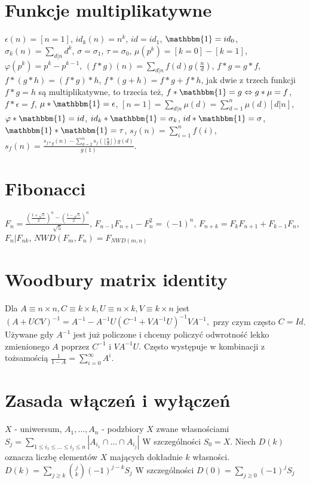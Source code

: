 \section{Funkcje multiplikatywne}
			$\epsilon\left(n\right) = [n = 1]$,
			$id_k\left(n\right) = n^k$, $id = id_1$, $\mathbbm{1} = id_0$,
			$\sigma_k\left(n\right) = \sum_{d|n}d^k$, $\sigma = \sigma_1$, $\tau = \sigma_0$,
			$\mu\left(p^k\right) = [k = 0] - [k = 1]$,
			$\varphi\left(p^k\right) = p^k - p^{k - 1}$,
			$\left(f \ast g\right)\left(n\right) = \sum_{d|n}f\left(d\right)g\left(\frac{n}{d}\right)$,
			$f \ast g = g \ast f$,
			$f \ast \left(g \ast h\right) = \left(f \ast g\right) \ast h$,
			$f \ast \left(g + h\right) = f \ast g + f \ast h$,
			jak dwie z trzech funkcji $f \ast g = h$ są multiplikatywne, to trzecia też,
			$f \ast \mathbbm{1} = g \Leftrightarrow g \ast \mu = f$,
			$f \ast \epsilon = f$,
			$\mu \ast \mathbbm{1} = \epsilon$, $[n = 1] = \sum_{d|n}\mu\left(d\right) =\sum_{d=1}^n\mu\left(d\right)[d|n]$,
			$\varphi \ast \mathbbm{1} = id$,
			$id_k \ast \mathbbm{1} = \sigma_k$, $id \ast \mathbbm{1} = \sigma$, $\mathbbm{1} \ast \mathbbm{1} = \tau$,
			$s_f\left(n\right) = \sum_{i=1}^nf\left(i\right)$,
			$s_f\left(n\right) = \frac{s_{f\ast g}\left(n\right) - \sum_{d=2}^n s_f\left(\lfloor\frac{n}{d}\rfloor\right)g\left(d\right)}{g\left(1\right)}$.

\section{Fibonacci}

$F_n = \frac{\left(\frac{1+\sqrt{5}}{2}\right)^n - \left(\frac{1-\sqrt{5}}{2}\right)^n}{\sqrt{5}}$,
$F_{n-1}F_{n+1}-F_n^2=(-1)^n$, $F_{n+k}=F_k F_{n+1} + F_{k-1} F_n$, $F_n | F_{nk}$, $NWD(F_m, F_n) = F_{NWD(m, n)}$

\section{Woodbury matrix identity}

Dla $A\equiv n\times n, C\equiv k\times k, U\equiv n\times k, V\equiv k\times n$
jest $(A+UCV)^{-1} = A^{-1} - A^{-1}U(C^{-1}+VA^{-1}U)^{-1}VA^{-1},$
przy czym często $C=Id$.
Używane gdy $A^{-1}$ jest już policzone i chcemy policzyć odwrotność lekko zmienionego $A$
poprzez $C^{-1}$ i $VA^{-1}U$.
Często występuje w kombinacji z tożsamością $\frac{1}{1-A} = \sum_{i=0}^\infty A^i$.

\section{Zasada włączeń i wyłączeń}
$X$ - uniwersum, $A_1, \dots, A_n$ - podzbiory $X$ zwane własnościami
$S_j = \sum_{1\le i_1 \le \dots \le i_j \le n} | A_{i_1} \cap \dots \cap A_{i_j}|$
W szczególności $S_0 = X$. Niech $D(k)$ oznacza liczbę elementów $X$ mających dokładnie $k$ własności.
$D(k) = \sum_{j\ge k}\binom{j}{k} \left(-1\right)^{j-k}S_j$
W szczególności $D(0) = \sum_{j \ge 0} \left(-1\right)^j S_j$
